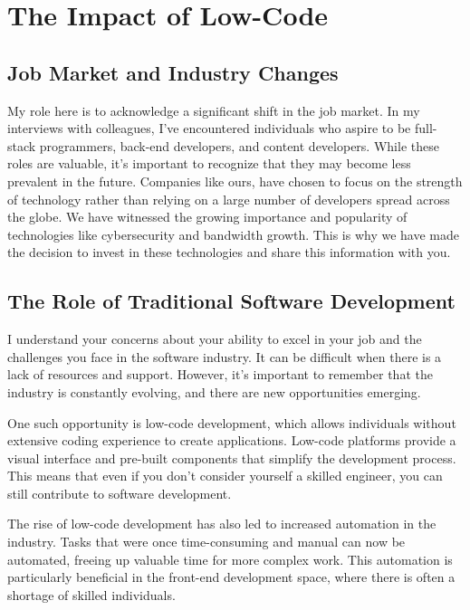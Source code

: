 \section{The Impact of Low-Code}\label{the-impact-of-low-code}

\subsection{Job Market and Industry
    Changes}\label{job-market-and-industry-changes}

My role here is to acknowledge a significant shift in the job market. In
my interviews with colleagues, I've encountered individuals who aspire
to be full-stack programmers, back-end developers, and content
developers. While these roles are valuable, it's important to recognize
that they may become less prevalent in the future. Companies like ours, have chosen to focus on the strength of technology rather
than relying on a large number of developers spread across the globe. We
have witnessed the growing importance and popularity of technologies
like cybersecurity and bandwidth growth. This is why we have made the
decision to invest in these technologies and share this information with
you.

\subsection{The Role of Traditional Software
    Development}\label{the-role-of-traditional-software-development}

I understand your concerns about your ability to excel in your job and
the challenges you face in the software industry. It can be difficult
when there is a lack of resources and support. However, it's important
to remember that the industry is constantly evolving, and there are new
opportunities emerging.

One such opportunity is low-code development, which allows individuals
without extensive coding experience to create applications. Low-code
platforms provide a visual interface and pre-built components that
simplify the development process. This means that even if you don't
consider yourself a skilled engineer, you can still contribute to
software development.

The rise of low-code development has also led to increased automation in
the industry. Tasks that were once time-consuming and manual can now be
automated, freeing up valuable time for more complex work. This
automation is particularly beneficial in the front-end development
space, where there is often a shortage of skilled individuals.

